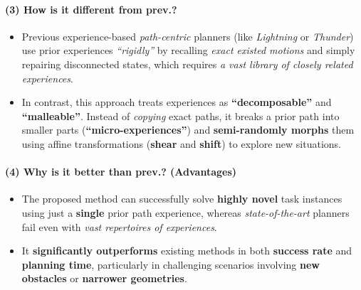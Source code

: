 \documentclass{article}
\begin{document}
\paragraph{(3) How is it different from prev.?}
\begin{itemize}
  \item Previous experience-based \textit{path-centric} planners (like \textit{Lightning} or \textit{Thunder}) use prior experiences \textit{``rigidly''} by recalling \textit{exact existed motions} and simply repairing disconnected states, which requires \textit{a vast library of closely related experiences}.
  \item In contrast, this approach treats experiences as \textbf{``decomposable''} and \textbf{``malleable''}. Instead of \textit{copying} exact paths, it breaks a prior path into smaller parts (\textbf{``micro-experiences''}) and \textbf{semi-randomly morphs} them using affine transformations (\textbf{shear} and \textbf{shift}) to explore new situations.
\end{itemize}

\paragraph{(4) Why is it better than prev.? (Advantages)} 
\begin{itemize}
  \item The proposed method can successfully solve \textbf{highly novel} task instances using just a \textbf{single} prior path experience, whereas \textit{state-of-the-art} planners fail even with \textit{vast repertoires of experiences}.
  \item It \textbf{significantly outperforms} existing methods in both \textbf{success rate} and \textbf{planning time}, particularly in challenging scenarios involving \textbf{new obstacles} or \textbf{narrower geometries}.
\end{itemize}
\end{document}
